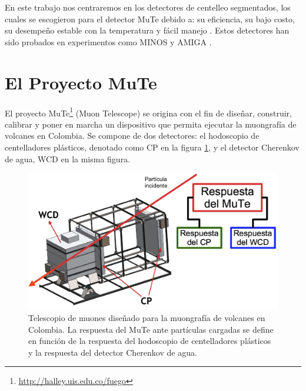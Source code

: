 \documentclass[12pt,oneside,openany,letter]{book}
\begin{document}
En este trabajo nos centraremos en los detectores de centelleo segmentados, los cuales se escogieron para el detector MuTe debido a: su eficiencia, su bajo costo, su desempeño estable con la temperatura y fácil manejo \cite{SuarezDuran2016}. Estos detectores han sido probados en experimentos como MINOS \cite{adamson-etal2002} y AMIGA \cite{amiga-etal2016}. 


\section{El Proyecto MuTe}
El proyecto MuTe\footnote{\url{http://halley.uis.edu.co/fuego}} (Muon Telescope) se origina con el fin de diseñar, construir, calibrar y poner en marcha un dispositivo que permita ejecutar la muongrafía de volcanes en Colombia. Se compone de dos detectores: el hodoscopio de centelladores pl\'asticos, denotado como CP en la figura \ref{mute}, y el detector Cherenkov de agua, WCD en la misma figura. 
\begin{figure}[h!]
    \centering        \includegraphics[scale=0.3]{mute.jpg}
\caption[Telescopio de Muones MuTe]{Telescopio de muones diseñado para la muongrafía de volcanes en Colombia. La respuesta del MuTe ante partículas cargadas se define en funci\'on de la respuesta del hodoscopio de centelladores plásticos y la respuesta del detector Cherenkov de agua.}\label{mute}
\end{figure}
\end{document}
